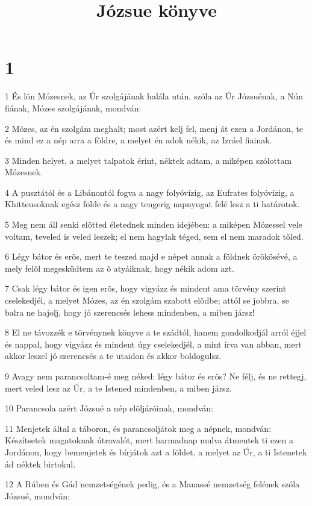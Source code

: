 

\title{Józsue könyve}


\chapter{1}

\par 1 És lõn Mózesnek, az Úr szolgájának halála után, szóla az Úr Józsuénak,  a Nún fiának, Mózes szolgájának, mondván:
\par 2 Mózes, az én szolgám meghalt; most azért kelj fel, menj át ezen a Jordánon, te és mind ez a nép arra a földre, a melyet én adok nékik, az Izráel fiainak.
\par 3 Minden helyet, a melyet talpatok érint, néktek adtam, a miképen szólottam Mózesnek.
\par 4 A pusztától és a Libánontól fogva a nagy folyóvízig, az Eufrates folyóvízig, a Khitteusoknak egész földe és a nagy tengerig napnyugat felé lesz a ti határotok.
\par 5 Meg nem áll senki elõtted életednek minden idejében: a miképen Mózessel vele voltam, teveled is veled leszek; el nem hagylak téged, sem el nem maradok  tõled.
\par 6 Légy bátor és erõs, mert te teszed majd e népet annak a földnek örökösévé,  a mely felõl megesküdtem az õ atyáiknak, hogy nékik adom azt.
\par 7 Csak légy bátor és igen erõs, hogy vigyázz és mindent ama törvény szerint cselekedjél, a melyet Mózes, az én szolgám szabott elõdbe; attól se jobbra, se balra ne hajolj, hogy jó szerencsés lehess mindenben, a miben jársz!
\par 8 El ne távozzék e törvénynek könyve a te szádtól, hanem gondolkodjál arról éjjel és nappal, hogy vigyázz és mindent úgy cselekedjél, a mint írva van abban, mert akkor leszel jó szerencsés a te utaidon és akkor boldogulsz.
\par 9 Avagy nem parancsoltam-é meg néked: légy bátor és erõs? Ne félj, és ne rettegj,  mert veled lesz az Úr, a te Istened mindenben, a miben jársz.
\par 10 Parancsola azért Józsué a nép elõljáróinak, mondván:
\par 11 Menjetek által a táboron, és parancsoljátok meg a népnek, mondván: Készítsetek magatoknak útravalót, mert harmadnap mulva átmentek ti ezen a Jordánon, hogy bemenjetek és bírjátok azt a földet, a melyet az Úr, a ti Istenetek ád néktek birtokul.
\par 12 A Rúben és Gád nemzetségének pedig, és a Manassé nemzetség felének szóla Józsué, mondván:
